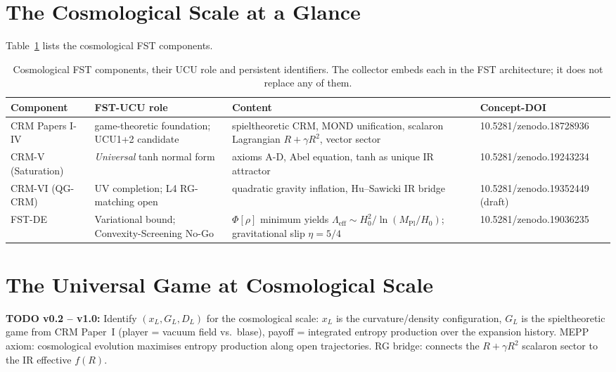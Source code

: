 \documentclass[11pt,a4paper]{article}
\theoremstyle{remark}
\begin{document}
\section{The Cosmological Scale at a Glance}
\label{sec:components}

Table~\ref{tab:cosmo-components} lists the cosmological FST components.

\begin{table}[h]
\centering
\renewcommand{\arraystretch}{1.2}
\small
\begin{tabular}{p{3.0cm}p{3.0cm}p{5.0cm}p{2.5cm}}
\toprule
\textbf{Component} & \textbf{FST-UCU role} & \textbf{Content} &
\textbf{Concept-DOI} \\
\midrule
CRM Papers I-IV   & game-theoretic foundation; UCU1+2 candidate     & spieltheoretic CRM, MOND unification, scalaron Lagrangian $R+\gamma R^2$, vector sector & 10.5281/zenodo.18728936 \\
CRM-V (Saturation)& \emph{Universal} tanh normal form               & axioms A-D, Abel equation, tanh as unique IR attractor  & 10.5281/zenodo.19243234 \\
CRM-VI (QG-CRM)   & UV completion; L4 RG-matching open              & quadratic gravity inflation, Hu--Sawicki IR bridge      & 10.5281/zenodo.19352449 (draft) \\
FST-DE            & Variational bound; Convexity-Screening No-Go    & $\Phi[\rho]$ minimum yields $\Lambda_\text{eff}\sim H_0^2/\ln(M_\text{Pl}/H_0)$; gravitational slip $\eta=5/4$ & 10.5281/zenodo.19036235 \\
\bottomrule
\end{tabular}
\caption{Cosmological FST components, their UCU role and persistent
identifiers. The collector embeds each in the FST architecture; it
does not replace any of them.}
\label{tab:cosmo-components}
\end{table}

\section{The Universal Game at Cosmological Scale}
\label{sec:game}

\textbf{TODO v0.2 -- v1.0:} Identify $(x_L, G_L, D_L)$ for the
cosmological scale: $x_L$ is the curvature/density configuration,
$G_L$ is the spieltheoretic game from CRM Paper~I (player = vacuum
field vs.\ blase), payoff = integrated entropy production over the
expansion history. MEPP axiom: cosmological evolution maximises
entropy production along open trajectories. RG bridge: connects the
$R + \gamma R^2$ scalaron sector to the IR effective $f(R)$.
\end{document}
